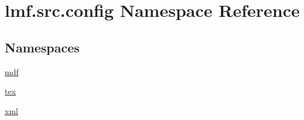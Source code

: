 \hypertarget{namespacelmf_1_1src_1_1config}{\section{lmf.\+src.\+config Namespace Reference}
\label{namespacelmf_1_1src_1_1config}
}
\subsection*{Namespaces}
\begin{DoxyCompactItemize}
\item 
 \hyperlink{namespacelmf_1_1src_1_1config_1_1mdf}{mdf}
\item 
 \hyperlink{namespacelmf_1_1src_1_1config_1_1tex}{tex}
\item 
 \hyperlink{namespacelmf_1_1src_1_1config_1_1xml}{xml}
\end{DoxyCompactItemize}
